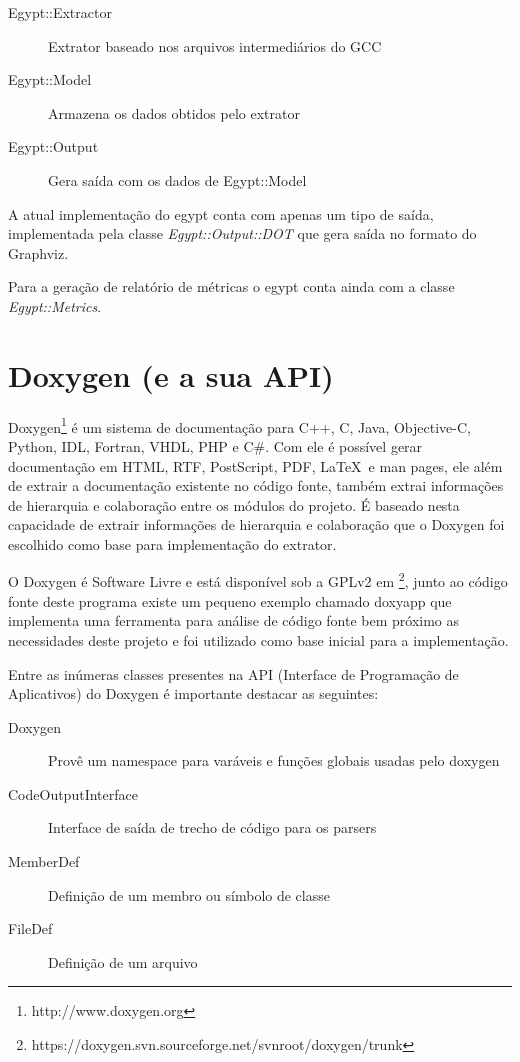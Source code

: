 \begin{description}
\item[Egypt::Extractor] Extrator baseado nos arquivos intermediários do GCC
\item[Egypt::Model] Armazena os dados obtidos pelo extrator
\item[Egypt::Output] Gera saída com os dados de Egypt::Model
\end{description}

A atual implementação do egypt conta com apenas um tipo de saída, implementada
pela classe {\it Egypt::Output::DOT} que gera saída no formato do Graphviz.

Para a geração de relatório de métricas o egypt conta ainda com a classe {\it
Egypt::Metrics}.

\section{Doxygen (e a sua API)}

Doxygen\footnote{http://www.doxygen.org} é um sistema de documentação para C++,
C, Java, Objective-C, Python, IDL,
Fortran, VHDL, PHP e C\#. Com ele é possível gerar documentação em
HTML, RTF,
PostScript, PDF, \LaTeX\ e man pages, ele
além de extrair a documentação existente no código fonte, também extrai
informações de hierarquia e colaboração entre os módulos do projeto. É baseado
nesta capacidade de extrair informações de hierarquia e colaboração que o
Doxygen foi escolhido como base para implementação do extrator.

O Doxygen é Software Livre e está disponível sob a GPLv2 em
\footnote{https://doxygen.svn.sourceforge.net/svnroot/doxygen/trunk}, junto ao
código fonte deste programa existe um pequeno exemplo chamado doxyapp que
implementa uma ferramenta para análise de código fonte bem próximo as
necessidades deste projeto e foi utilizado como base inicial para a
implementação.

Entre as inúmeras classes presentes na API (Interface de Programação de Aplicativos) do Doxygen é importante
destacar as seguintes:

\begin{description}
\item[Doxygen] Provê um namespace para varáveis e funções globais usadas pelo doxygen
\item[CodeOutputInterface] Interface de saída de trecho de código para os parsers
\item[MemberDef] Definição de um membro ou símbolo de classe
\item[FileDef] Definição de um arquivo
\end{description}

